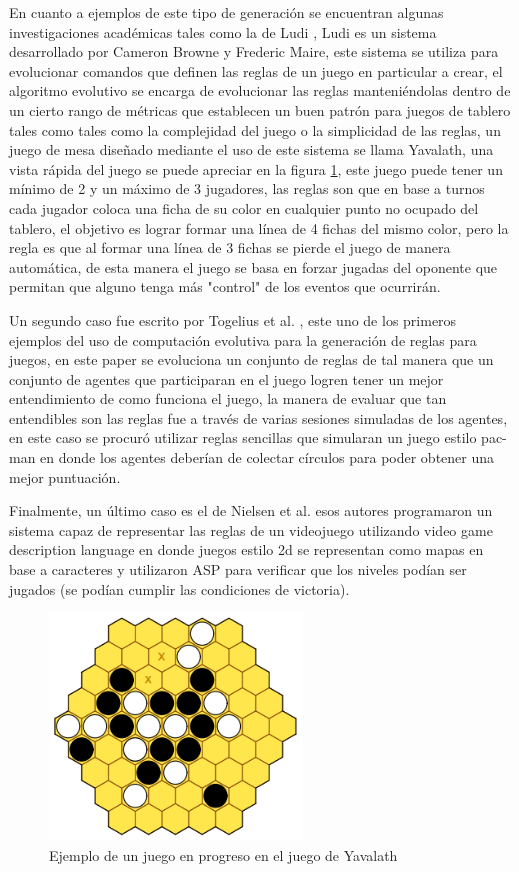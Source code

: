 En cuanto a ejemplos de este tipo de generación se encuentran algunas
investigaciones académicas tales como la de Ludi \cite{Browne2010}, Ludi es un
sistema desarrollado por Cameron Browne y Frederic Maire, este sistema se
utiliza para evolucionar comandos que definen las reglas de un juego en
particular a crear, el algoritmo evolutivo se encarga de evolucionar las reglas
manteniéndolas dentro de un cierto rango de métricas que establecen un buen
patrón para juegos de tablero tales como tales como la complejidad del juego o
la simplicidad de las reglas, un juego de mesa diseñado mediante el uso de este
sistema se llama Yavalath, una vista rápida del juego se puede apreciar en la
figura \ref{figure:Yavalath}, este juego puede tener un mínimo de 2 y un máximo
de 3 jugadores, las reglas son que en base a turnos cada jugador coloca una
ficha de su color en cualquier punto no ocupado del tablero, el objetivo es
lograr formar una línea de 4 fichas del mismo color, pero la regla es que al
formar una línea de 3 fichas se pierde el juego de manera automática, de esta
manera el juego se basa en forzar jugadas del oponente que permitan que alguno
tenga más "control" de los eventos que ocurrirán. 

Un segundo caso fue escrito por Togelius et al. \cite{Togelius2008}, este uno de
los primeros ejemplos del uso de computación evolutiva para la generación de
reglas para juegos, en este paper se evoluciona un conjunto de reglas de tal
manera que un conjunto de agentes que participaran en el juego logren tener un
mejor entendimiento de como funciona el juego, la manera de evaluar que tan
entendibles son las reglas fue a través de varias sesiones simuladas de los
agentes, en este caso se procuró utilizar reglas sencillas que simularan un
juego estilo pac-man en donde los agentes deberían de colectar círculos para
poder obtener una mejor puntuación.

Finalmente, un último caso es el de Nielsen et al. \cite{Nielsen2015} esos
autores programaron un sistema capaz de representar las reglas de un videojuego
utilizando video game description language en donde juegos estilo 2d se
representan como mapas en base a caracteres y utilizaron ASP para verificar que
los niveles podían ser jugados (se podían cumplir las condiciones de victoria).

\begin{figure}
    \centering
    \includegraphics[width=0.6\textwidth]{img/Yavalath.png}
    \caption{Ejemplo de un juego en progreso en el juego de Yavalath}
    \label{figure:Yavalath}
\end{figure}

